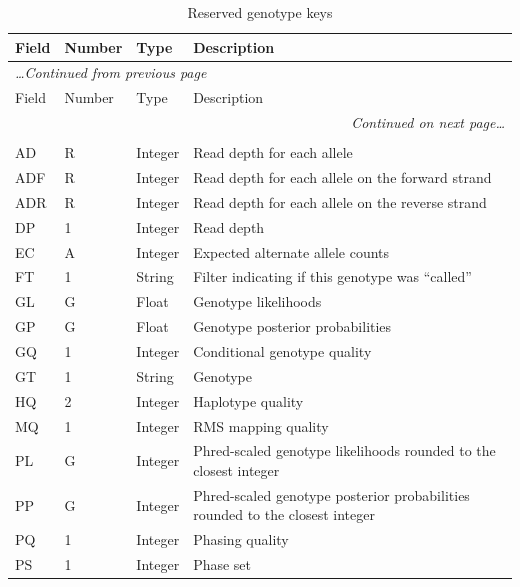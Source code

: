 \documentclass[8pt]{article}
\begin{document}
\begin{longtable}[c]{ | p{2.5cm} | p{1.5cm} | p{1.5cm} | p{10.3cm} | }
      \hline
      Field		& Number	& Type		& Description \\ \hline
  \endfirsthead
      \multicolumn{4}{l}{\small\emph{\ldots Continued from previous page}} \\[0.7ex]
      \hline
      Field		& Number	& Type		& Description \\ \hline
  \endhead
      \hline
      \multicolumn{4}{r}{\small\emph{Continued on next page\ldots}} \\
      \caption[]{Reserved genotype keys}
  \endfoot
      \hline
      \multicolumn{4}{l}{} \\
      \caption{Reserved genotype keys}
      \label{table:reserved-genotypes}
  \endlastfoot
      AD		& R		& Integer	& Read depth for each allele \\
      ADF		& R		& Integer	& Read depth for each allele on the forward strand \\
      ADR		& R		& Integer	& Read depth for each allele on the reverse strand \\
      DP		& 1		& Integer	& Read depth \\
      EC		& A		& Integer	& Expected alternate allele counts \\
      FT		& 1		& String	& Filter indicating if this genotype was ``called'' \\
      GL		& G		& Float		& Genotype likelihoods \\
      GP		& G		& Float		& Genotype posterior probabilities \\
      GQ		& 1		& Integer	& Conditional genotype quality \\
      GT		& 1		& String	& Genotype \\
      HQ		& 2		& Integer	& Haplotype quality \\
      MQ		& 1		& Integer	& RMS mapping quality \\
      PL		& G		& Integer	& Phred-scaled genotype likelihoods rounded to the closest integer \\
      PP		& G		& Integer	& Phred-scaled genotype posterior probabilities rounded to the closest integer \\
      PQ		& 1		& Integer	& Phasing quality \\
      PS		& 1		& Integer	& Phase set \\
\end{longtable}
\end{document}
